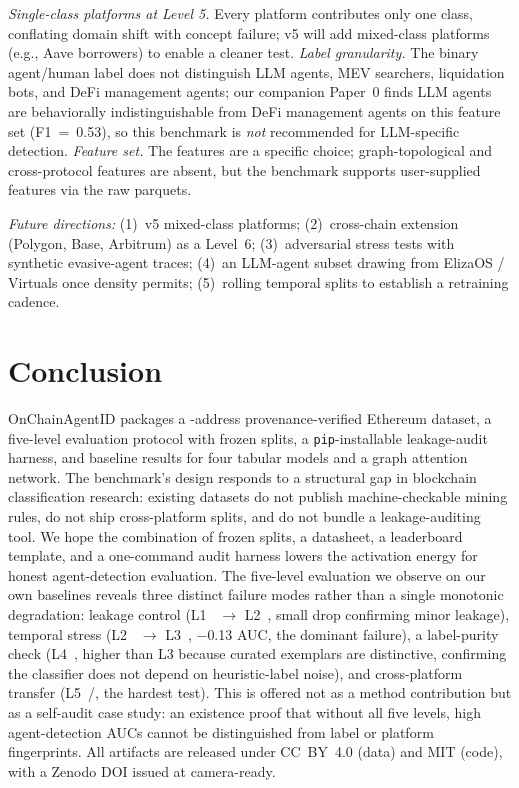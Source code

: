 \documentclass[10pt]{article}
\begin{document}
\emph{Single-class platforms at Level 5.} Every platform contributes only one class, conflating domain shift with concept failure; v5 will add mixed-class platforms (e.g., Aave borrowers) to enable a cleaner test. \emph{Label granularity.} The binary agent/human label does not distinguish LLM agents, MEV searchers, liquidation bots, and DeFi management agents; our companion Paper~0 finds LLM agents are behaviorally indistinguishable from DeFi management agents on this feature set (F1~=~0.53), so this benchmark is \emph{not} recommended for LLM-specific detection. \emph{Feature set.} The \datasetNFeatures{} features are a specific choice; graph-topological and cross-protocol features are absent, but the benchmark supports user-supplied features via the raw parquets.

\emph{Future directions:} (1)~v5 mixed-class platforms; (2)~cross-chain extension (Polygon, Base, Arbitrum) as a Level~6; (3)~adversarial stress tests with synthetic evasive-agent traces; (4)~an LLM-agent subset drawing from ElizaOS / Virtuals once density permits; (5)~rolling temporal splits to establish a retraining cadence.

\section{Conclusion}
\label{sec:conclusion}

OnChainAgentID packages a \datasetNAddresses{}-address provenance-verified Ethereum dataset, a five-level evaluation protocol with frozen splits, a \texttt{pip}-installable leakage-audit harness, and baseline results for four tabular models and a graph attention network. The benchmark's design responds to a structural gap in blockchain classification research: existing datasets do not publish machine-checkable mining rules, do not ship cross-platform splits, and do not bundle a leakage-auditing tool. We hope the combination of frozen splits, a datasheet, a leaderboard template, and a one-command audit harness lowers the activation energy for honest agent-detection evaluation. The five-level evaluation we observe on our own baselines reveals three distinct failure modes rather than a single monotonic degradation: leakage control (L1~\cascadeLevelLeakyAuc{} $\to$ L2~\randomCvRfAuc{}, small drop confirming minor leakage), temporal stress (L2~\randomCvRfAuc{} $\to$ L3~\temporalHoldoutRfAuc{}, $-$0.13 AUC, the dominant failure), a label-purity check (L4~\cascadeLevelStrictCoreAuc{}, higher than L3 because curated exemplars are distinctive, confirming the classifier does not depend on heuristic-label noise), and cross-platform transfer (L5~\lopoRfPooledAuc{}/\mixedClassLopoRfAuc{}, the hardest test). This is offered not as a method contribution but as a self-audit case study: an existence proof that without all five levels, high agent-detection AUCs cannot be distinguished from label or platform fingerprints. All artifacts are released under CC~BY~4.0 (data) and MIT (code), with a Zenodo DOI issued at camera-ready.
\end{document}
